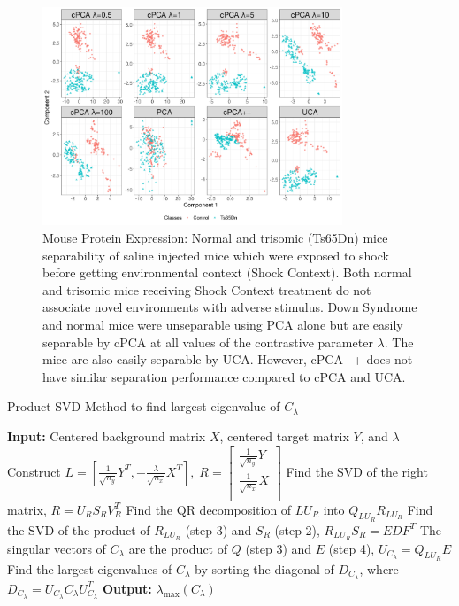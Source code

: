 \documentclass[nocrop]{bioinfo}
\begin{document}
\begin{methods}
\begin{figure}[t!]
  \centering
  \includegraphics[width = 0.8\textwidth]{figure/Mouse_Data_shapes.png}
  \caption{Mouse Protein Expression: Normal and trisomic (Ts65Dn) mice separability of saline injected mice which were exposed to shock before getting environmental context (Shock Context). Both normal and trisomic mice receiving Shock Context treatment do not associate novel environments with adverse stimulus. Down Syndrome and normal mice were unseparable using PCA alone but are easily separable by cPCA at all values of the contrastive parameter $\lambda$.  The mice are also easily separable by UCA.  However, cPCA++ does not have similar separation performance compared to cPCA and UCA.}
  \label{fig:Mouse}
\end{figure}

\begin{algorithm}[ht]
    \caption{Product SVD Method to find largest eigenvalue of $C_\lambda$}
  \label{algo:product-svd}
  \SetAlgoLined
  \textbf{Input:} Centered background matrix $X$, centered target matrix $Y$, and $\lambda$\;
  \nl Construct 
  $  L = \left[ \frac{1}{\sqrt{n_{y}}}Y^T, - \frac{\lambda}{\sqrt{n_{x}}} X^T\right],\;
  R = \begin{bmatrix*} \frac{1}{\sqrt{n_{y}}}Y \\ \frac{1}{\sqrt{n_{x}}}X \\ \end{bmatrix*} $\;
  \nl  Find the SVD of the right matrix, $R = U_R S_R V^T_R$ \;
  \nl  Find the QR decomposition of $LU_R$ into  $Q_{LU_R}R_{LU_R}$ \;
  \nl  Find the SVD of the product of $R_{LU_R}$ (step 3) and $S_R$ (step 2), $R_{LU_R}S_{R} = EDF^T$ \;
  \nl  The singular vectors of $C_\lambda$ are the product of $Q$ (step 3) and $E$ (step 4), $U_{C_\lambda} = Q_{LU_R}E$ \;
  \nl  Find the largest eigenvalues of $C_\lambda$ by sorting the diagonal of $D_{C_\lambda}$, where $D_{C_\lambda} = U_{C_\lambda} C_\lambda U_{C_\lambda}^T$ \;
  \textbf{Output:} $\lambda_{\text{max}}\left( C_\lambda \right)$ 
\end{algorithm}


\end{methods}
\end{document}
